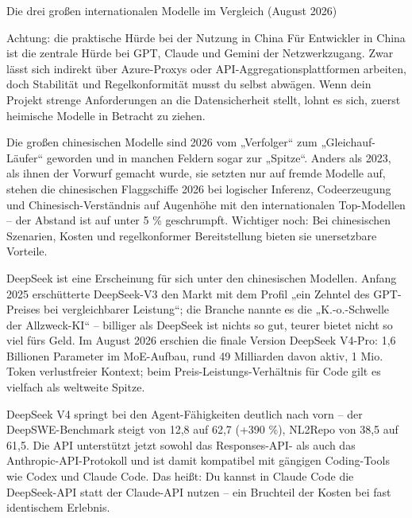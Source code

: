 \begin{center}\small\color{gray}Die drei großen internationalen Modelle im Vergleich (August 2026)\end{center}

\begin{tcbwarn}{Achtung: die praktische Hürde bei der Nutzung in China}
Für Entwickler in China ist die zentrale Hürde bei GPT, Claude und Gemini der Netzwerkzugang. Zwar lässt sich indirekt über Azure-Proxys oder API-Aggregationsplattformen arbeiten, doch Stabilität und Regelkonformität musst du selbst abwägen. Wenn dein Projekt strenge Anforderungen an die Datensicherheit stellt, lohnt es sich, zuerst heimische Modelle in Betracht zu ziehen.

\end{tcbwarn}


Die großen chinesischen Modelle sind 2026 vom „Verfolger“ zum „Gleichauf-Läufer“ geworden und in manchen Feldern sogar zur „Spitze“. Anders als 2023, als ihnen der Vorwurf gemacht wurde, sie setzten nur auf fremde Modelle auf, stehen die chinesischen Flaggschiffe 2026 bei logischer Inferenz, Codeerzeugung und Chinesisch-Verständnis auf Augenhöhe mit den internationalen Top-Modellen – der Abstand ist auf unter 5 \% geschrumpft. Wichtiger noch: Bei chinesischen Szenarien, Kosten und regelkonformer Bereitstellung bieten sie unersetzbare Vorteile.


DeepSeek ist eine Erscheinung für sich unter den chinesischen Modellen. Anfang 2025 erschütterte DeepSeek-V3 den Markt mit dem Profil „ein Zehntel des GPT-Preises bei vergleichbarer Leistung“; die Branche nannte es die „K.-o.-Schwelle der Allzweck-KI“ – billiger als DeepSeek ist nichts so gut, teurer bietet nicht so viel fürs Geld. Im August 2026 erschien die finale Version DeepSeek V4-Pro: 1,6 Billionen Parameter im MoE-Aufbau, rund 49 Milliarden davon aktiv, 1 Mio. Token verlustfreier Kontext; beim Preis-Leistungs-Verhältnis für Code gilt es vielfach als weltweite Spitze.

DeepSeek V4 springt bei den Agent-Fähigkeiten deutlich nach vorn – der DeepSWE-Benchmark steigt von 12,8 auf 62,7 (+390 \%), NL2Repo von 38,5 auf 61,5. Die API unterstützt jetzt sowohl das Responses-API- als auch das Anthropic-API-Protokoll und ist damit kompatibel mit gängigen Coding-Tools wie Codex und Claude Code. Das heißt: Du kannst in Claude Code die DeepSeek-API statt der Claude-API nutzen – ein Bruchteil der Kosten bei fast identischem Erlebnis.

